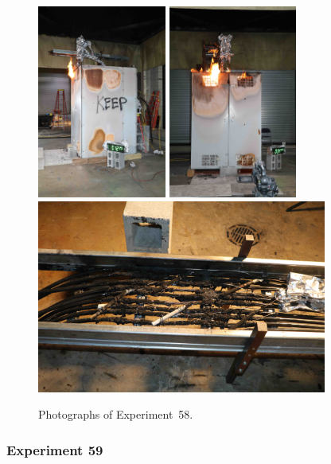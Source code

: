 \begin{figure}[p]
\centering
\includegraphics[height=2.50in,angle=-90]{../FIGURES/Test_58_12_min_29_s}
\includegraphics[height=2.50in,angle=-90]{../FIGURES/Test_58_34_min_44_s} \\
\includegraphics[height=2.50in]{../FIGURES/Test_58_scar}
\caption[Photographs of Experiment~58]{Photographs of Experiment~58.}
\label{fig:Test_58_photos}
\end{figure}


\clearpage

\subsubsection{Experiment 59}

